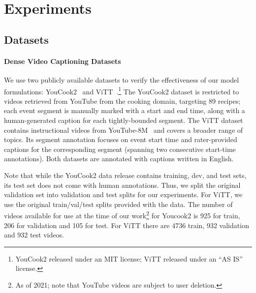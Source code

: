 \documentclass[11pt]{article}
\begin{document}
\section{Experiments}
\subsection{Datasets}
\paragraph{Dense Video Captioning Datasets}
We use two publicly available datasets to verify the effectiveness of our model formulations: YouCook2~\citep{ZhXuCoAAAI18} and ViTT~\citep{Huang2020MultimodalPF}.\footnote{YouCook2 released under an MIT license; ViTT released under an ``AS IS'' license.}
The YouCook2 dataset is restricted to videos retrieved from YouTube from the cooking domain, targeting 89 recipes; each event segment is manually marked with a start and end time, along with a human-generated caption for each tightly-bounded segment.
The ViTT dataset contains instructional videos from YouTube-8M~\citep{AbuElHaija2016YouTube8MAL} and covers a broader range of topics. Its segment annotation focuses on event start time and rater-provided captions for the corresponding segment (spanning two consecutive start-time annotations).
Both datasets are annotated with captions written in English.  

Note that while the YouCook2 data release contains training, dev, and test sets, its test set does not come with human annotations. 
Thus, we split the original validation set into validation and test splits for our experiments.
For ViTT, we use the original train/val/test splits provided with the data.
The number of videos available for use at the time of our work\footnote{As of 2021; note that YouTube videos are subject to user deletion.} for Youcook2 is 925 for train, 206 for validation and 105 for test. For ViTT there are 4736 train, 932 validation and 932 test videos.
\end{document}
